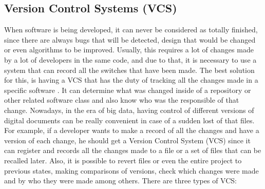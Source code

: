 \documentclass[mim_thesis.tex]{subfiles}
\begin{document}
\subsection{Version Control Systems (VCS)}
When software is being developed, it can never be considered as totally finished, since there are always bugs that will be detected, design that would be changed or even algorithms to be improved. Usually, this requires a lot of changes made by a lot of developers in the same code, and due to that, it is necessary to use a system that can record all the switches that have been made. The best solution for this, is having a \ac{VCS} that has the duty of tracking all the changes made in a specific software \citep{loeliger2012version}. It can determine what was changed inside of a repository or other related software class and also know who was the responsible of that change. Nowadays, in the era of big data, having control of different versions of digital documents can be really convenient in case of a sudden lost of that files. For example, if a developer wants to make a record of all the changes and have a version of each change, he should get a Version Control System (VCS) since it can register and records all the changes made to a file or a set of files that can be recalled later. Also, it is possible to revert files or even the entire project to previous states, making comparisons of versions, check which changes were made and by who they were made among others. There are three types of VCS:   
\end{document}
